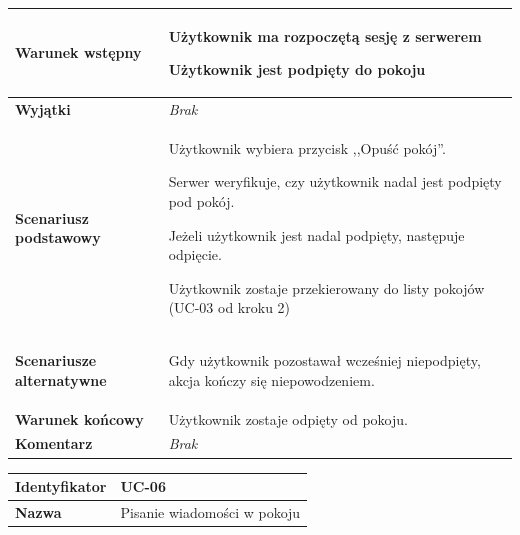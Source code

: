 {\begin{tabular}{ | l | l | }
	\hline
		\textbf{Warunek wstępny} & \parbox[t]{11cm}{
			\begin{enumreq}
				\item Użytkownik ma rozpoczętą sesję z serwerem
				\item Użytkownik jest podpięty do pokoju
			\end{enumreq}

		}
		\\

	\hline
		\textbf{Wyjątki} & \parbox[t]{11cm}{
			\textit{Brak}
		}
		\\

	\hline
		\textbf{Scenariusz podstawowy} & \parbox[t]{11cm}{
			\begin{enumreq}
				\item Użytkownik wybiera przycisk ,,Opuść pokój''.
				\item Serwer weryfikuje, czy użytkownik nadal jest podpięty pod pokój.
				\item Jeżeli użytkownik jest nadal podpięty, następuje odpięcie.
				\item Użytkownik zostaje przekierowany do listy pokojów (UC-03 od kroku
				2)
			\end{enumreq}
		}
		\\

	\hline
		\textbf{Scenariusze alternatywne} & \parbox[t]
		{11cm}{
			\begin{enumreq}
				\item Gdy użytkownik pozostawał wcześniej niepodpięty, akcja kończy się
				niepowodzeniem.
			\end{enumreq}
		}
		\\

	\hline
		\textbf{Warunek końcowy} & \parbox[t]{11cm}{
			Użytkownik zostaje odpięty od pokoju.
		}
		\\

	\hline
		\textbf{Komentarz} & \parbox[t]{11cm}{
			\textit{Brak}
		}
		\\

	\hline
\end{tabular}

\vspace{2em}

\begin{tabular}{ | l | l | }
	\hline
		\textbf{Identyfikator} &
		UC-06
		\\

	\hline
		\textbf{Nazwa} &
		Pisanie wiadomości w pokoju
		\\


\end{tabular}}
